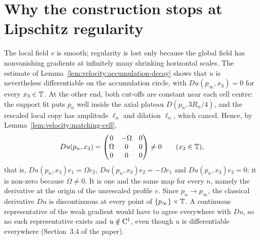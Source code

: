 \section{Why the construction stops at Lipschitz regularity}

The local field $v $ is smooth; regularity is lost only because the global field has
nonvanishing gradients at infinitely many shrinking horizontal scales.  The estimate of
Lemma~\ref{lem:velocity:accumulation-decay} shows that $u $ is nevertheless differentiable on
the accumulation circle, with $Du(p_\infty,x_3)=0 $ for every $x_3\in\mathbb{T} $.  At the other end,
both cut-offs are constant near each cell centre: the support fit puts $p_n $ well inside the
axial plateau $D(p_n,3R_n/4) $, and the rescaled local copy has amplitude $\ell_n $ and
dilation $\ell_n $, which cancel.  Hence, by Lemma~\ref{lem:velocity:matching-cell},
\[
  Du(p_n,x_3)=
  \begin{pmatrix}
    0      & -\Omega & 0 \\
    \Omega & 0       & 0 \\
    0      & 0       & 0
  \end{pmatrix}
  \neq0
  \qquad(x_3\in\mathbb{T}),
\]
that is, $Du(p_n,x_3)e_1=\Omega e_2 $, $Du(p_n,x_3)e_2=-\Omega e_1 $ and $Du(p_n,x_3)e_3=0 $;
it is non-zero because $\Omega\neq0 $.  It is one and the same map for every $n $, namely the
derivative at the origin of the unrescaled profile $v $.  Since $p_n\to p_\infty $, the
classical derivative $Du $ is discontinuous at every point of $\{p_\infty\}\times\mathbb{T} $.  A
continuous representative of the weak gradient would have to agree everywhere with $Du $, so
no such representative exists and
$u\notin\mathrm{C}^1 $, even though $u $ is differentiable everywhere (Section~3.4 of the paper).

